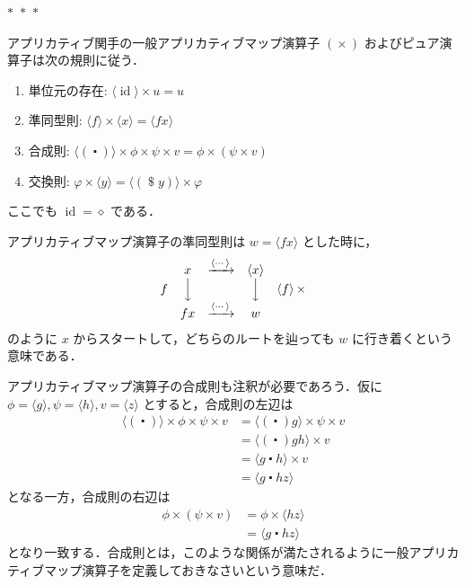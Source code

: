 \documentclass[a4paper,twocolumn]{jsbook}
\newcommand{\separator}{\begin{center}$*$~$*$~$*$\end{center}}
\newcommand{\mAnonParam}{\diamond}
\DeclareMathOperator{\mId}{id}
\DeclareMathOperator{\mApply}{\$}
\DeclareMathOperator{\mAppMap}{\times}
\DeclareMathOperator{\mComp}{\centerdot}
\DeclareMathOperator{\mMap}{\bullet}
\newcommand{\mPureWith}[1]{\langle#1\rangle}
\begin{document}
\separator

アプリカティブ関手の一般アプリカティブマップ演算子 $(\mAppMap)$ およびピュア演算子は次の規則に従う．
\begin{enumerate}
\item 単位元の存在: $\mPureWith{\mId}\mAppMap u=u$
\item 準同型則: $\mPureWith{f}\mAppMap\mPureWith{x}=\mPureWith{fx}$
\item 合成則: $\mPureWith{(\mComp)}\mAppMap\phi\mAppMap\psi\mAppMap v=\phi\mAppMap{}(\psi\mAppMap v)$
\item 交換則: $\varphi\mAppMap\mPureWith{y}=\mPureWith{(\mApply y)}\mAppMap\varphi$
\end{enumerate}
ここでも $\mId=\mAnonParam$ である．

アプリカティブマップ演算子の準同型則は $w=\mPureWith{fx}$ とした時に，
\begin{equation}
\begin{matrix}
&x&\xrightarrow{\mPureWith{\dotsb}}&\mPureWith{x}\\
f&\Big\downarrow&&\Big\downarrow&\mPureWith{f}\mAppMap\\
&fx&\xrightarrow{\mPureWith{\dotsb}}&w
\end{matrix}
\end{equation}
のように $x$ からスタートして，どちらのルートを辿っても $w$ に行き着くという意味である．

アプリカティブマップ演算子の合成則も注釈が必要であろう．仮に $\phi=\mPureWith{g},\psi=\mPureWith{h},v=\mPureWith{z}$ とすると，合成則の左辺は
\begin{align}
\mPureWith{(\mComp)}\mAppMap\phi\mAppMap\psi\mAppMap v
&=\mPureWith{(\mComp)g}\mAppMap\psi\mAppMap v\\
&=\mPureWith{(\mComp)gh}\mAppMap v\\
&=\mPureWith{g\mComp h}\mAppMap v\\
&=\mPureWith{g\mComp hz}
\end{align}
となる一方，合成則の右辺は
\begin{align}
\phi\mAppMap{}(\psi\mAppMap v)
&=\phi\mAppMap\mPureWith{hz}\\
&=\mPureWith{g\mComp hz}
\end{align}
となり一致する．合成則とは，このような関係が満たされるように一般アプリカティブマップ演算子を定義しておきなさいという意味だ．
\end{document}
